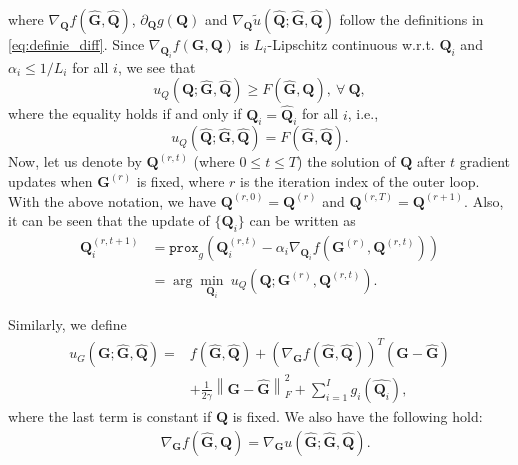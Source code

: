 \documentclass[10pt,journal]{IEEEtran}
\newcommand{\G}{\boldsymbol{G}}
\newcommand{\Q}{\boldsymbol{Q}}
\begin{document}
where $\nabla_{{\bm Q}} f\left(\hat{\bm G},\hat{\bm Q}\right)$, $\partial_{\Q} g(\Q)$ and $\nabla_{{\bm Q}}\tilde{u}\left(\hat{\bm Q};\hat{\bm G},\hat{\bm Q}\right)$ follow the definitions in \eqref{eq:definie_diff}.
Since $\nabla_{{\bm Q}_i} f({\bm G},{\bm Q})$ is $L_i$-Lipschitz continuous w.r.t. ${\bm Q}_i$ and $\alpha_i\leq 1/L_i$ for all $i$, we see that
\begin{equation}\label{eq:gleqf}
	u_Q\left({\bm Q};\hat{\bm G},\hat{\bm Q}\right)\geq F\left(\hat{\bm G},{\bm Q}\right),~\forall~{\bm Q},
\end{equation}
where the equality holds if and only if ${\bm Q}_i = \hat{\bm Q}_i$ for all $i$, i.e.,
\begin{equation}\label{eq:geqf}
u_Q\left(\hat{\bm Q};\hat{\bm G},\hat{\bm Q}\right) = F\left(\hat{\bm G},\hat{\bm Q}\right).
\end{equation}
Now, let us denote by ${\bm Q}^{(r,t)}$ (where $0\leq t\leq T$) the solution of ${\bm Q}$
after $t$ gradient updates when ${\bm G}^{(r)}$ is fixed, where $r$ is the iteration index of the outer loop.
With the above notation, we have ${\bm Q}^{(r,0)}={\bm Q}^{(r)}$ and ${\bm Q}^{(r,T)}={\bm Q}^{(r+1)}$.
Also, it can be seen that the update of $\{{\bm Q}_i\}$ can be written as
\begin{equation}\label{eq:updateQ}
\begin{aligned}
	{\bm Q}_i^{(r,t+1)}&= \texttt{prox}_{g}\left({\bm Q}_i^{(r,t)} - \alpha_i \nabla_{{\bm Q}_i} f\left({\bm G}^{(r)},{\bm Q}^{(r,t)}\right)\right)\\
	                 &= \arg\min_{{\bm Q}_i}~u_{Q}\left( {\bm Q};{\bm G}^{(r)},{\bm Q}^{(r,t)} \right).
\end{aligned}
\end{equation}


Similarly, we define
\begin{align*}
u_G\left(\G;\hat{\bm G},\hat{\bm Q}\right) = &f(\hat{\bm G},\hat{\bm Q}) +  (\nabla_{\G} f(\hat{\bm G},\hat{\bm Q}))^T(\G-\hat{\bm G})\\
& + \frac{1}{2\gamma}\left\|\G-\hat{\G}\right\|_F^2+ \sum_{i=1}^Ig_i(\hat{\Q_i}),
\end{align*}
where the last term is constant if $\Q$ is fixed.
We also have the following hold:
\begin{equation}\label{eq:Ggradequal}
\begin{aligned}
	&\nabla_{\G} f\left(\hat{\bm G},\hat{\bm Q}\right)=\nabla_{\G} {u}\left(\hat{\bm G};\hat{\bm G},\hat{\bm Q}\right).
\end{aligned}
\end{equation}
\end{document}
